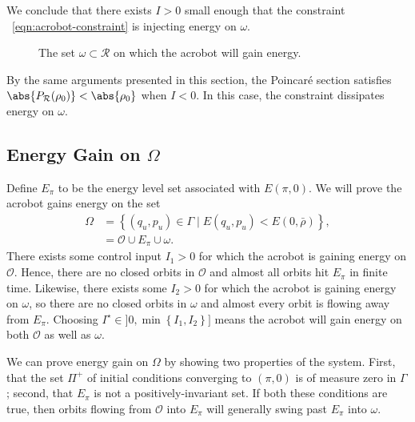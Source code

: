 We conclude that there exists \(I > 0\) small enough that the constraint
~\eqref{eqn:acrobot-constraint} is injecting energy on \(\omega\).

\begin{figure}
    \centering
    
    \caption{The set \(\omega \subset \mathcal{R}\) on which the acrobot will gain energy.
    }
    \label{fig:acrobot-little-omega}
\end{figure}

By the same arguments presented in this section, the Poincar\'{e} section
satisfies \(\abs{P_\mathcal{R}(\rho_0)} < \abs{\rho_0}\) when \(I < 0\).
In this case, the constraint dissipates energy on \(\omega\).

\subsection{Energy Gain on \(\Omega\)}
Define \(E_\pi\) to be the energy level set associated with \(E(\pi,0)\).
We will prove the acrobot gains energy on the set 
\begin{align*}
    \Omega &= \left\{(q_u,p_u) \in \Gamma
    \mid E(q_u,p_u) < E(0,\bar{\rho}) \right\}
    ,\\
    &= \mathcal{O} \cup E_\pi \cup \omega
    .
\end{align*}
There exists some control input \(I_1 > 0\) for which the acrobot is gaining
energy on \(\mathcal{O}\). 
Hence, there are no closed orbits in \(\mathcal{O}\) and almost all orbits 
hit \(E_\pi\) in finite time.
Likewise, there exists some \(I_2 > 0\) for which the acrobot is gaining energy
on \(\omega\), so there are no closed orbits in \(\omega\) and almost every
orbit is flowing away from \(E_\pi\).
Choosing \(I^\star \in ]0,\min\left\{I_1,I_2\right\}]\) means the acrobot will gain energy on
both \(\mathcal{O}\) as well as \(\omega\).

We can prove energy gain on \(\Omega\) by showing two properties of the system.
First, that the set \(\Pi^+\) of initial conditions converging to  \((\pi,0)\)
is of measure zero in \(\Gamma\);
second, that \(E_\pi\) is not a positively-invariant set.
If both these conditions are true, then orbits flowing from \(\mathcal{O}\) into
\(E_\pi\) will generally swing past \(E_\pi\) into \(\omega\).

